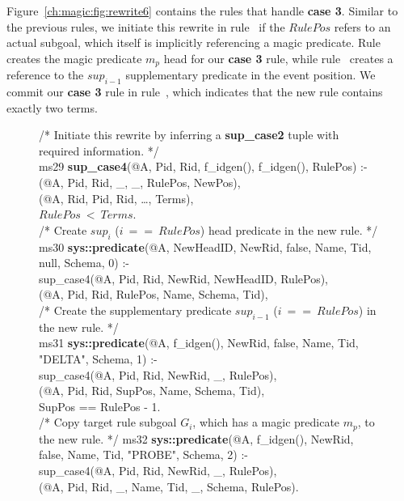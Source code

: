 Figure~\ref{ch:magic:fig:rewrite6} contains the rules that handle {\bf case 3}.
Similar to the previous rules, we initiate this rewrite in rule~ if
the $RulePos$ refers to an actual subgoal, which itself is implicitly
referencing a magic predicate.  Rule~ creates the magic predicate
$m_p$ head for our {\bf case 3} rule, while rule~ creates a reference
to the $sup_{i-1}$ supplementary predicate in the event position.
We commit our {\bf case 3} rule in rule~, which indicates that the
new rule contains exactly two terms.

\begin{figure}[!t]
\ssp
\centering
\begin{boxedminipage}{\linewidth}
/* Initiate this rewrite by inferring a {\bf sup\_case2} tuple with required information. */ \\
ms29 {\bf sup\_case4}(@A, Pid, Rid, f\_idgen(), f\_idgen(), RulePos) :- \\
(@A, Pid, Rid, \_, \_, RulePos, NewPos), \\
(@A, Rid, Pid, Rid, \ldots, Terms), \\
\datalogspace $RulePos\ <\ Terms$. \\
	
/* Create $sup_i$ ($i\ ==\ RulePos$) head predicate in the new rule. */ \\
ms30 {\bf sys::predicate}(@A, NewHeadID, NewRid, false, Name, Tid, null, Schema, 0) :- \\
\datalogspace sup\_case4(@A, Pid, Rid, NewRid, NewHeadID, RulePos), \\
(@A, Pid, Rid, RulePos, Name, Schema, Tid), \\
	
/* Create the supplementary predicate $sup_{i-1}$ ($i\ ==\ RulePos$) in the new rule. */ \\
ms31 {\bf sys::predicate}(@A, f\_idgen(), NewRid, false, Name, Tid, "DELTA", Schema, 1) :- \\
\datalogspace sup\_case4(@A, Pid, Rid, NewRid, \_, RulePos), \\
(@A, Pid, Rid, SupPos, Name, Schema, Tid), \\
\datalogspace SupPos == RulePos - 1. \\

/* Copy target rule subgoal $G_i$, which has a magic predicate $m_p$, to the new rule. */
ms32 {\bf sys::predicate}(@A, f\_idgen(), NewRid, false, Name, Tid, "PROBE", Schema, 2) :- \\
\datalogspace sup\_case4(@A, Pid, Rid, NewRid, \_, RulePos), \\
(@A, Pid, Rid, \_, Name, Tid, \_, Schema, RulePos). \\
	

\end{boxedminipage}
\end{figure}
